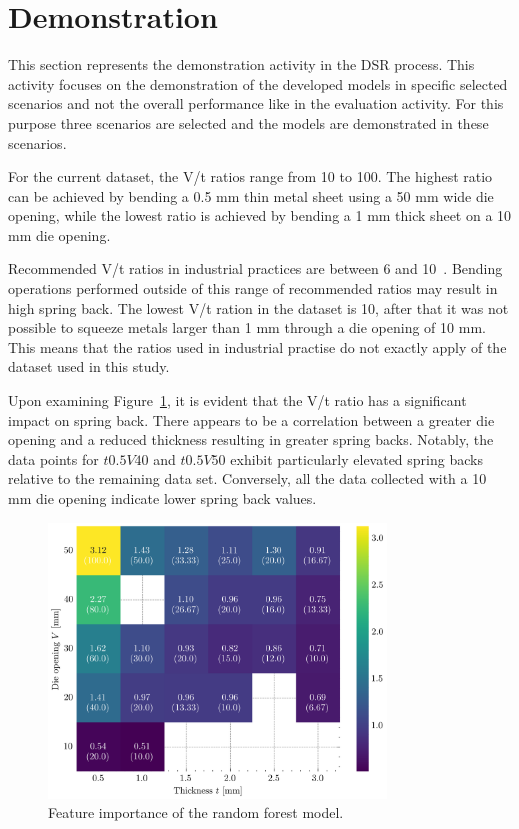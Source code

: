 \section{Demonstration}\label{sec:demonstration}
This section represents the demonstration activity in the \ac{DSR} process.
This activity focuses on the demonstration of the developed models in specific selected scenarios and not the
overall performance like in the evaluation activity.
For this purpose three scenarios are selected and the models are demonstrated in these scenarios.

For the current dataset, the V/t ratios range from 10 to 100.
The highest ratio can be achieved by bending a 0.5 mm thin metal sheet using a 50 mm wide die opening, while the
lowest ratio is achieved by bending a 1 mm thick sheet on a 10 mm die opening.

Recommended V/t ratios in industrial practices are between 6 and 10~\cite[p.7]{cruz_applicationmachinelearning_2021}.
Bending operations performed outside of this range of recommended ratios may result in
high spring back.
The lowest V/t ration in the dataset is 10, after that it was not possible to squeeze metals larger than 1 mm
through a die opening of 10 mm.
This means that the ratios used in industrial practise do not exactly apply of the dataset used in this study.

Upon examining Figure~\ref{fig:springback-heatmap}, it is evident that the V/t ratio has a significant impact on
spring back.
There appears to be a correlation between a greater die opening and a reduced thickness resulting in greater spring
backs.
Notably, the data points for $t0.5 V40$ and $t0.5 V50$ exhibit particularly elevated spring backs relative to the
remaining data set.
Conversely, all the data collected with a 10 mm die opening indicate lower spring back values.

\begin{figure}[h]
    \begin{tcolorbox}[arc=0pt,boxrule=0.5pt]
        \centering
        \includegraphics[width=0.8\textwidth]{chap5/images/mean_springback_heatmap}
    \end{tcolorbox}
    \caption{Feature importance of the random forest model.}
    \label{fig:springback-heatmap}
\end{figure}

